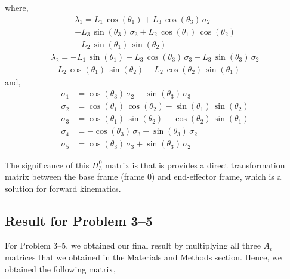 \documentclass[conference]{IEEEtran}
\begin{document}
where,
\begin{multline*}
    \lambda_1 = L_1 \,\cos \left(\theta_1 \right)+L_3 \,\cos \left(\theta_3 \right)\,\sigma_2 \\-L_3 \,\sin \left(\theta_3 \right)\,\sigma_3 +L_2 \,\cos \left(\theta_1 \right)\,\cos \left(\theta_2 \right)\\-L_2 \,\sin \left(\theta_1 \right)\,\sin \left(\theta_2 \right)
\end{multline*}
\begin{multline*}
    \lambda_2 = -L_1 \,\sin \left(\theta_1 \right)-L_3 \,\cos \left(\theta_3 \right)\,\sigma_3 -L_3 \,\sin \left(\theta_3 \right)\,\sigma_2\\ -L_2 \,\cos \left(\theta_1 \right)\,\sin \left(\theta_2 \right)-L_2 \,\cos \left(\theta_2 \right)\,\sin \left(\theta_1 \right)
\end{multline*}
and,
\begin{align*}
    \sigma_1 &=\cos \left(\theta_3 \right)\,\sigma_2 -\sin \left(\theta_3 \right)\,\sigma_3 \\
    \sigma_2 &=\cos \left(\theta_1 \right)\,\cos \left(\theta_2 \right)-\sin \left(\theta_1 \right)\,\sin \left(\theta_2 \right)\\
    \sigma_3 &=\cos \left(\theta_1 \right)\,\sin \left(\theta_2 \right)+\cos \left(\theta_2 \right)\,\sin \left(\theta_1 \right)\\
    \sigma_4 &= -\cos \left(\theta_3 \right)\,\sigma_3 -\sin \left(\theta_3 \right)\,\sigma_2\\
    \sigma_5 &= \cos \left(\theta_3 \right)\,\sigma_3 +\sin \left(\theta_3 \right)\,\sigma_2
\end{align*}

The significance of this $H^0_3$ matrix is that is provides
a direct transformation matrix between the base frame (frame 0) and end-effector frame,
which is a solution for forward kinematics.

\subsection{Result for Problem 3--5}

For Problem 3--5, we obtained our final result by multiplying all three $A_i$ matrices
that we obtained in the Materials and Methods section. Hence, we obtained the following
matrix,
\end{document}
